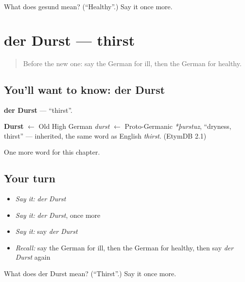 \begin{tcolorbox}[breakable,colback=teal!4,colframe=teal!35!black,title={Before you move on}]
What does gesund mean? (\textquotedblleft{}Healthy\textquotedblright{}.) Say it once more.
\end{tcolorbox}
\section[der Durst]{der Durst — thirst}

\label{lesson:GE-C60-durst}



\begin{quote}
Before the new one: say the German for ill, then the German for healthy.
\end{quote}

\subsection*{You'll want to know: der Durst}
\textbf{der Durst} — \textquotedblleft{}thirst\textquotedblright{}.

\begin{cousinweb}
\textbf{Durst} $\leftarrow$ Old High German \emph{durst} $\leftarrow$ Proto-Germanic \emph{*þurstuz}, \textquotedblleft{}dryness, thirst\textquotedblright{} — inherited, the same word as English \emph{thirst}. (EtymDB 2.1)
\end{cousinweb}

\begin{grammarlens}[title={What you've built}]
One more word for this chapter.
\end{grammarlens}

\subsection*{Your turn}
\begin{itemize}
\raggedright
  \item \emph{Say it:} \emph{der Durst}
  \item \emph{Say it:} \emph{der Durst}, once more
  \item \emph{Say it:} say \emph{der Durst}
  \item \emph{Recall:} say the German for ill, then the German for healthy, then say \emph{der Durst} again
\end{itemize}

\begin{tcolorbox}[breakable,colback=teal!4,colframe=teal!35!black,title={Before you move on}]
What does der Durst mean? (\textquotedblleft{}Thirst\textquotedblright{}.) Say it once more.
\end{tcolorbox}
